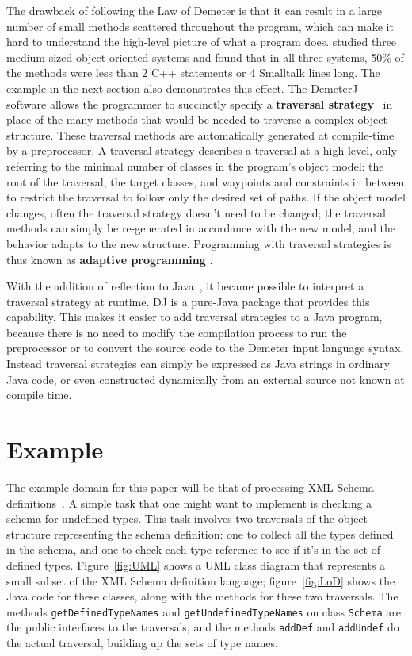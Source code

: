 \documentclass{llncs}
\newcommand{\defn}[1]{\textbf{#1}}
\newcommand{\code}[1]{\texttt{#1}}
\begin{document}
The drawback of following the Law of Demeter is that it can result in
a large number of small methods scattered throughout the program,
which can make it hard to understand the high-level picture of what a
program does.  \cite{wilde-etal:maint-support} studied three
medium-sized object-oriented systems and found that in all three
systems, 50\% of the methods were less than 2 C++ statements or 4
Smalltalk lines long.  The example in the next section also
demonstrates this effect.  The
DemeterJ~\cite{cse:preventive}~\cite{DemeterJ:00} software allows the
programmer to succinctly specify a \defn{traversal
strategy}~\cite{strategies-tr:LP97} in place of the many methods that
would be needed to traverse a complex object structure.  These
traversal methods are automatically generated at compile-time by a
preprocessor.  A traversal strategy describes a traversal at a high
level, only referring to the minimal number of classes in the
program's object model: the root of the traversal, the target classes,
and waypoints and constraints in between to restrict the traversal to
follow only the desired set of paths.  If the object model changes,
often the traversal strategy doesn't need to be changed; the traversal
methods can simply be re-generated in accordance with the new model,
and the behavior adapts to the new structure.  Programming with
traversal strategies is thus known as \defn{adaptive programming}
\cite{karl:demeter}.

With the addition of reflection to Java~\cite{java-reflection}, it
became possible to interpret a traversal strategy at runtime.  DJ
\cite{DJ:99} is a pure-Java package that provides this capability.
This makes it easier to add traversal strategies to a Java program,
because there is no need to modify the compilation process to run the
preprocessor or to convert the source code to the Demeter input
language syntax.  Instead traversal strategies can simply be expressed
as Java strings in ordinary Java code, or even constructed dynamically
from an external source not known at compile time.

\section{Example}

The example domain for this paper will be that of processing XML
Schema definitions~\cite{XML-schema}.  A simple task that one might
want to implement is checking a schema for undefined types.  This task
involves two traversals of the object structure representing the
schema definition: one to collect all the types defined in the schema,
and one to check each type reference to see if it's in the set of
defined types.  Figure~\ref{fig:UML} shows a UML class diagram that
represents a small subset of the XML Schema definition language;
figure~\ref{fig:LoD} shows the Java code for these classes, along with
the methods for these two traversals.  The methods
\code{getDefinedTypeNames} and \code{getUndefinedTypeNames} on class
\code{Schema} are the public interfaces to the traversals, and the
methods \code{addDef} and \code{addUndef} do the actual traversal,
building up the sets of type names.
\end{document}
